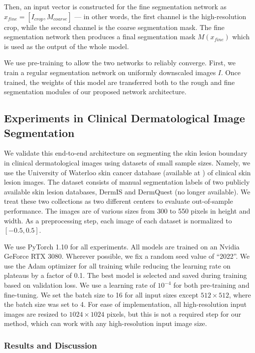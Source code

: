 Then, an input vector is constructed for the fine segmentation network as $x_{fine} = [I_{crop}, M_{coarse}]$ --- in other words, the first channel is the high-resolution crop, while the second channel is the coarse segmentation mask. The fine segmentation network then produces a final segmentation mask $M(x_{fine})$ which is used as the output of the whole model.

We use pre-training to allow the two networks to reliably converge. First, we train a regular segmentation network on uniformly downscaled images $I$. Once trained, the weights of this model are transferred both to the rough and fine segmentation modules of our proposed network architecture.

\subsection{Experiments in Clinical Dermatological Image Segmentation}

We validate this end-to-end architecture on segmenting the skin lesion boundary in clinical dermatological images using datasets of small sample sizes. Namely, we use the University of Waterloo skin cancer database \cite{waterloo} (available at \cite{uwaterlooSkinCancer}) of clinical skin lesion images. The dataset consists of manual segmentation labels of two publicly available skin lesion databases, DermIS \cite{dermisDermIS} and DermQuest (no longer available). We treat these two collections as two different centers to evaluate out-of-sample performance. The images are of various sizes from 300 to 550 pixels in height and width. As a preprocessing step, each image of each dataset is normalized to $[-0.5, 0.5]$.

We use PyTorch 1.10 for all experiments. All models are trained on an Nvidia GeForce RTX 3080. Wherever possible, we fix a random seed value of ``2022''. We use the Adam optimizer for all training while reducing the learning rate on plateaus by a factor of 0.1. The best model is selected and saved during training based on validation loss. We use a learning rate of $10^{-4}$ for both pre-training and fine-tuning. We set the batch size to 16 for all input sizes except $512 \times 512$, where the batch size was set to 4. For ease of implementation, all high-resolution input images are resized to $1024 \times 1024$ pixels, but this is not a required step for our method, which can work with any high-resolution input image size.

\subsubsection{Results and Discussion}

